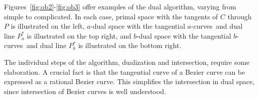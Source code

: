 \documentclass[twocolumn,10pt]{article}
\newcommand{\atangs}{tangential $a$-curves\ }
\newcommand{\btangs}{tangential $b$-curves\ }
\begin{document}
Figures~\ref{fig:ob2}-\ref{fig:ob3} offer examples of the dual algorithm,
varying from simple to complicated.
In each case, primal space with the tangents of $C$ through $P$ is illustrated
on the left, $a$-dual space with the \atangs and dual line $P_a^*$ is illustrated
on the top right, and $b$-dual space with the \btangs and dual line $P_b^*$ 
is illustrated on the bottom right.



\begin{figure*}
\hspace{.8in} \setjjpoega
\caption{A simple example of our algorithm}
\label{fig:ob2}
\end{figure*}



\begin{figure*}
\hspace{.8in} \setjjpoegb
\caption{A second example}
\label{fig:ob1}
\end{figure*}



\begin{figure*}
\hspace{.8in} \setjjpoegc
\caption{A more complicated example}
\label{fig:ob3}
\end{figure*}

The individual steps of the algorithm, dualization and intersection,
require some elaboration.
A crucial fact is that the tangential curve of a 
Bezier curve can be expressed as a rational Bezier curve.
This simplifies the intersection in dual space,
since intersection of Bezier curves is well understood.
\end{document}
